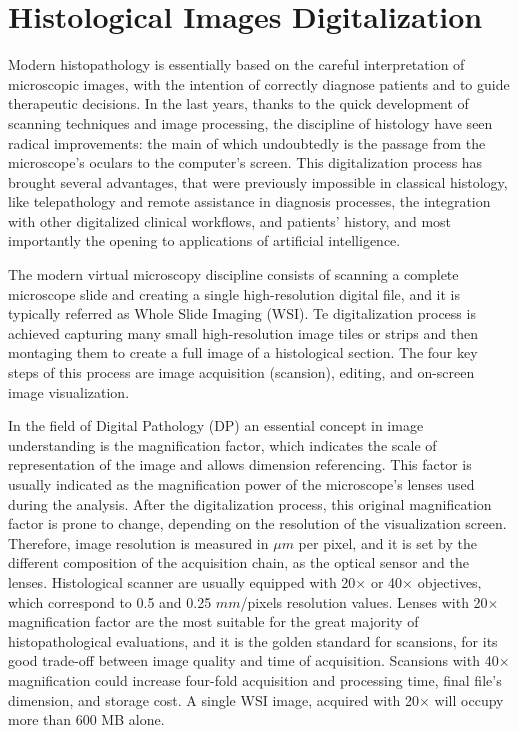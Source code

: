 \section{Histological Images Digitalization} \label{ssec:hist_im}
    Modern histopathology is essentially based on the careful interpretation of microscopic images, with the intention of correctly diagnose patients and to guide therapeutic decisions. In the last years, thanks to the quick development of scanning techniques and image processing, the discipline of histology have seen radical improvements: the main of which undoubtedly is the passage from the microscope's oculars to the computer's screen. This digitalization process has brought several advantages, that were previously impossible in classical histology, like telepathology and remote assistance in diagnosis processes, the integration with other digitalized clinical workflows, and patients' history, and most importantly the opening to applications of artificial intelligence.

    The modern virtual microscopy discipline consists of scanning a complete microscope slide and creating a single high-resolution digital file, and it is typically referred as Whole Slide Imaging (WSI). Te digitalization process is achieved capturing many small high-resolution image tiles or strips and then montaging them to create a full image of a histological section. The four key steps of this process are image acquisition (scansion), editing, and on-screen image visualization.

    In the field of Digital Pathology (DP) an essential concept in image understanding is the magnification factor, which indicates the scale of representation of the image and allows dimension referencing. This factor is usually indicated as the magnification power of the microscope's lenses used during the analysis. After the digitalization process, this original magnification factor is prone to change, depending on the resolution of the visualization screen. Therefore, image resolution is measured in $\mu m$ per pixel, and it is set by the different composition of the acquisition chain, as the optical sensor and the lenses. Histological scanner are usually equipped with 20$\times$ or 40$\times$ objectives, which correspond to 0.5 and 0.25 $mm$/pixels resolution values. Lenses with 20$\times$ magnification factor are the most suitable for the great majority of histopathological evaluations, and it is the golden standard for scansions, for its good trade-off between image quality and time of acquisition. Scansions with 40$\times$ magnification could increase four-fold acquisition and processing time, final file's dimension, and storage cost. A single WSI image, acquired with 20$\times$ will occupy more than 600 MB alone.

